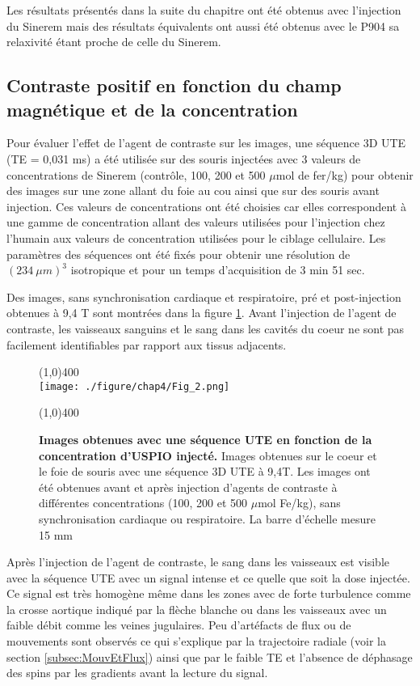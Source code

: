 Les résultats présentés dans la suite du chapitre ont été obtenus avec l'injection du Sinerem mais des résultats équivalents ont aussi été obtenus avec le P904 sa relaxivité étant proche de celle du Sinerem.

\subsection{Contraste positif en fonction du champ magnétique et de la concentration}

Pour évaluer l'effet de l'agent de contraste sur les images, une séquence 3D UTE (TE = 0,031 ms) a été utilisée sur des souris injectées avec 3 valeurs de concentrations de Sinerem (contrôle, 100, 200 et 500 $\mu$mol de fer/kg) pour obtenir des images sur une zone allant du foie au cou ainsi que sur des souris avant injection. Ces valeurs de concentrations ont été choisies car elles correspondent à une gamme de concentration allant des valeurs utilisées pour l'injection chez l'humain aux valeurs de concentration utilisées pour le ciblage cellulaire.
Les paramètres des séquences ont été fixés pour obtenir une résolution de $(234 \ \mu m)^3$ isotropique et pour un temps d'acquisition de 3 min 51 sec.

Des images, sans synchronisation cardiaque et respiratoire, pré et post-injection obtenues à 9,4 T sont montrées dans la figure \ref{fig:UTEConcen}.  Avant l'injection de l'agent de contraste, les vaisseaux sanguins et le sang dans les cavités du coeur ne sont pas facilement identifiables par rapport aux tissus adjacents.

\begin{figure}[H]
\centering
\line(1,0){400} \\
\texttt{[image: ./figure/chap4/Fig\_2.png]}
\caption[Images obtenues avec une séquence UTE en fonction de la concentration d'USPIO injecté.]{\label{fig:UTEConcen} \textbf{Images obtenues avec une séquence UTE en fonction de la concentration d'USPIO injecté.} Images obtenues sur le coeur et le foie de souris avec une séquence 3D UTE à 9,4T. Les images ont été obtenues avant et après injection d'agents de contraste à différentes concentrations (100, 200 et 500 $\mu$mol Fe/kg), sans synchronisation cardiaque ou respiratoire. La barre d'échelle mesure 15 mm  }
\line(1,0){400} \\ 
\end{figure}

Après l'injection de l'agent de contraste, le sang dans les vaisseaux est visible avec la séquence UTE avec un signal intense et ce quelle que soit la dose injectée. Ce signal est très homogène même dans les zones avec de forte turbulence comme la crosse aortique indiqué par la flèche blanche ou dans les vaisseaux avec un faible débit comme les veines jugulaires. Peu d'artéfacts de flux ou de mouvements sont observés ce qui s'explique par la trajectoire radiale (voir la section \ref{subsec:MouvEtFlux}) ainsi que par le faible TE et l'absence de déphasage des spins par les gradients avant la lecture du signal.

